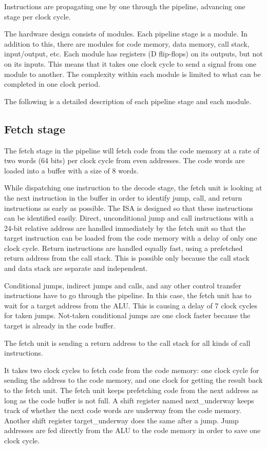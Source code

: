 \documentclass[11pt,a4paper,oneside,openright]{report}
\newcommand{\vv}{ \vspace{2mm} }   %
\begin{document}
Instructions are propagating one by one through the pipeline, advancing one stage per clock cycle.
\vv

The hardware design consists of modules. Each pipeline stage is a module. In addition to this, there are modules for code memory, data memory, call stack, input/output, etc. Each module has registers (D flip-flops) on its outputs, but not on its inputs. This means that it takes one clock cycle to send a signal from one module to another. The complexity within each module is limited to what can be completed in one clock period.
\vv

The following is a detailed description of each pipeline stage and each module.
\vv

\subsection{Fetch stage}
The fetch stage in the pipeline will fetch code from the code memory at a rate of two words (64 bits) per clock cycle from even addresses. The code words are loaded into a buffer with a size of 8 words.
\vv

While dispatching one instruction to the decode stage, the fetch unit is looking at the next instruction in the buffer in order to identify jump, call, and return instructions as early as possible. The ISA is designed so that these instructions can be identified easily. Direct, unconditional jump and call instructions with a 24-bit relative address are handled immediately by the fetch unit so that the target instruction can be loaded from the code memory with a delay of only one clock cycle. Return instructions are handled equally fast, using a prefetched return address from the call stack. This is possible only because the call stack and data stack are separate and independent.
\vv

Conditional jumps, indirect jumps and calls, and any other control transfer instructions have to go through the pipeline. In this case, the fetch unit has to wait for a target address from the ALU. This is causing a delay of 7 clock cycles for taken jumps. Not-taken conditional jumps are one clock faster because the target is already in the code buffer.
\vv

The fetch unit is sending a return address to the call stack for all kinds of call instructions.
\vv

It takes two clock cycles to fetch code from the code memory: one clock cycle for sending the address to the code memory, and one clock for getting the result back to the fetch unit. The fetch unit keeps prefetching code from the next address as long as the code buffer is not full. A shift register named next\_underway keeps track of whether the next code words are underway from the code memory. Another shift register target\_underway does the same after a jump. Jump addresses are fed directly from the ALU to the code memory in order to save one clock cycle.
\vv
\end{document}
